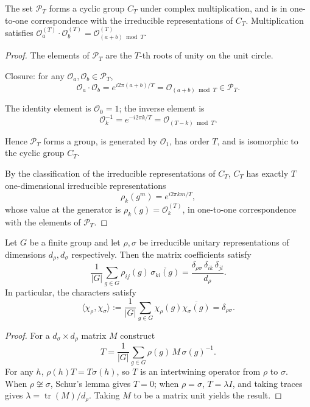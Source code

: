 \begin{proposition}\label{prop:PPO_group}
The set $\mathcal{P}_T$ forms a cyclic group $C_T$ under complex multiplication, and is in one-to-one correspondence with the irreducible representations of $C_T$. Multiplication satisfies $\mathcal{O}_a^{(T)} \cdot \mathcal{O}_b^{(T)} = \mathcal{O}_{(a+b) \bmod T}^{(T)}$.
\end{proposition}

\begin{proof}
The elements of $\mathcal{P}_T$ are the $T$-th roots of unity on the unit circle.

Closure: for any $\mathcal{O}_a, \mathcal{O}_b \in \mathcal{P}_T$,
\[
\mathcal{O}_a \cdot \mathcal{O}_b
= e^{i2\pi(a+b)/T}
= \mathcal{O}_{(a+b)\bmod T} \in \mathcal{P}_T.
\]

The identity element is $\mathcal{O}_0 = 1$;
the inverse element is
\[
\mathcal{O}_k^{-1}
= e^{-i2\pi k/T}
= \mathcal{O}_{(T-k)\bmod T}.
\]

Hence $\mathcal{P}_T$ forms a group, is generated by $\mathcal{O}_1$,
has order $T$, and is isomorphic to the cyclic group $C_T$.

By the classification of the irreducible representations of $C_T$,
$C_T$ has exactly $T$ one-dimensional irreducible representations
\[
\rho_k(g^m) = e^{i2\pi km/T},
\]
whose value at the generator is $\rho_k(g) = \mathcal{O}_k^{(T)}$,
in one-to-one correspondence with the elements of $\mathcal{P}_T$.
\end{proof}

\begin{proposition}\label{prop:schur_orthogonality}
Let $G$ be a finite group and let $\rho,\sigma$ be irreducible unitary representations of dimensions $d_\rho,d_\sigma$ respectively. Then the matrix coefficients satisfy
\[
\frac{1}{|G|}\sum_{g\in G}\rho_{ij}(g)\,\overline{\sigma_{kl}(g)}
=\frac{\delta_{\rho\sigma}\,\delta_{ik}\,\delta_{jl}}{d_\rho}.
\]
In particular, the characters satisfy
\[
\langle\chi_\rho,\chi_\sigma\rangle:=\frac{1}{|G|}\sum_{g\in G}\chi_\rho(g)\overline{\chi_\sigma(g)}=\delta_{\rho\sigma}.
\]
\end{proposition}

\begin{proof}
For a $d_\sigma\times d_\rho$ matrix $M$ construct
\[
T=\frac{1}{|G|}\sum_{g\in G}\rho(g)\,M\,\sigma(g)^{-1}.
\]
For any $h$, $\rho(h)T=T\sigma(h)$, so $T$ is an intertwining operator from $\rho$ to $\sigma$. When $\rho\not\cong\sigma$, Schur's lemma gives $T=0$; when $\rho=\sigma$, $T=\lambda I$, and taking traces gives $\lambda=\operatorname{tr}(M)/d_\rho$. Taking $M$ to be a matrix unit yields the result.
\end{proof}

